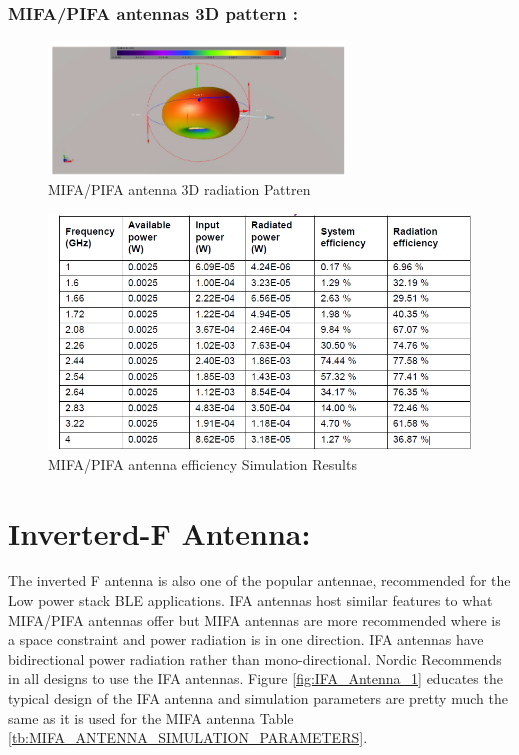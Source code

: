 \subsubsection{MIFA/PIFA antennas 3D pattern :}
\begin{figure}[h]
	\centering
	\includegraphics[width=0.7\textwidth]{Chap03/Figures/mifa_antenna_3d.PNG}
	\caption{MIFA/PIFA antenna 3D radiation Pattren}
	\label{fig:MIFA_3D}
\end{figure}

\begin{figure}[h]
	\centering
	\includegraphics[width=1\textwidth]{Chap03/Figures/mifa_antenna_effieciency.PNG}
	\caption{MIFA/PIFA antenna efficiency Simulation Results}
	\label{fig:MIFA_antenna_effieciency}
\end{figure}

\section{Inverterd-F Antenna:}
The inverted F antenna is also one of the popular antennae, recommended for the Low power stack BLE applications. IFA antennas host similar features to what MIFA/PIFA antennas offer but MIFA antennas are more recommended where is a space constraint and power radiation is in one direction. IFA antennas have bidirectional power radiation rather than mono-directional. Nordic Recommends in all designs to use the IFA antennas. Figure \ref{fig:IFA_Antenna_1} educates the typical design of the IFA antenna and simulation parameters are pretty much the same as it is used for the MIFA antenna Table \ref{tb:MIFA_ANTENNA_SIMULATION_PARAMETERS}.

